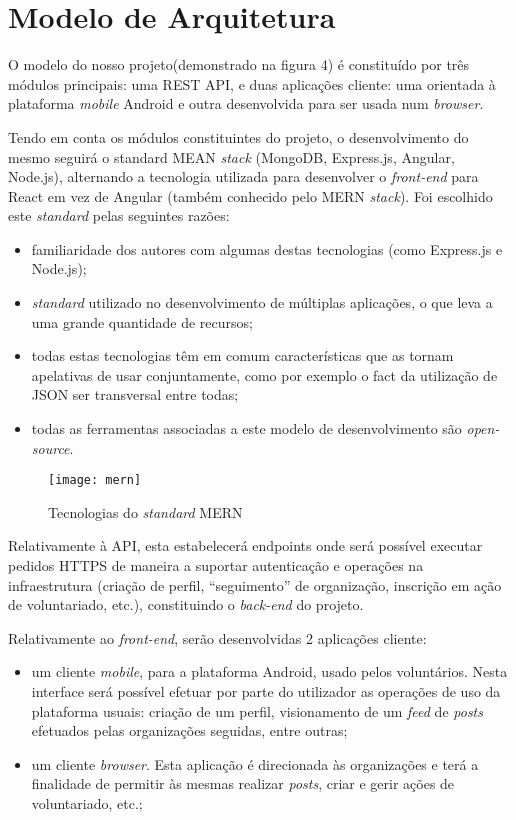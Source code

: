\section{Modelo de Arquitetura} 
O modelo do nosso projeto(demonstrado na figura 4) é constituído por três módulos principais: uma REST API, e duas aplicações cliente: uma orientada à plataforma \textit{mobile} Android e outra desenvolvida para ser usada num \textit{browser}. \par \medskip

Tendo em conta os módulos constituintes do projeto, o desenvolvimento do mesmo seguirá o standard MEAN \textit{stack} (MongoDB, Express.js, Angular, Node.js), alternando a tecnologia utilizada para desenvolver o \textit{front-end} para React em vez de Angular (também conhecido pelo MERN \textit{stack}). Foi escolhido este \textit{standard} pelas seguintes razões:
\begin{itemize}
	\item familiaridade dos autores com algumas destas tecnologias (como Express.js e Node.js);
	\item \textit{standard} utilizado no desenvolvimento de múltiplas aplicações, o que leva a uma grande quantidade de recursos;
	\item todas estas tecnologias têm em comum características que as tornam apelativas de usar conjuntamente, como por exemplo o fact da utilização de JSON ser transversal entre todas;
	\item todas as ferramentas associadas a este modelo de desenvolvimento são \textit{open-source}.
\end{itemize}

\begin{figure}[h]
	\centering
	\texttt{[image: mern]}
	\caption{Tecnologias do \textit{standard} MERN}
\end{figure}

Relativamente à API, esta estabelecerá endpoints onde será possível executar pedidos HTTPS de maneira a suportar autenticação e operações na infraestrutura (criação de perfil, “seguimento” de organização, inscrição em ação de voluntariado, etc.), constituindo o \textit{back-end} do projeto.
\par \medskip

Relativamente ao \textit{front-end}, serão desenvolvidas 2 aplicações cliente: 
\begin{itemize}
	\item um cliente \textit{mobile}, para a plataforma Android, usado pelos voluntários. Nesta interface será possível efetuar por parte do utilizador as operações de uso da plataforma usuais: criação de um perfil, visionamento de um \textit{feed} de \textit{posts} efetuados pelas organizações seguidas, entre outras;
	\item um cliente \textit{browser}. Esta aplicação é direcionada às organizações e terá a finalidade de permitir às mesmas realizar \textit{posts}, criar e gerir ações de voluntariado, etc.;
\end{itemize}

